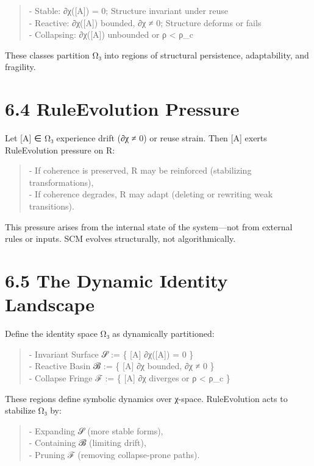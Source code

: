 \begin{quote}
- Stable: ∂χ({[}A{]}) = 0; Structure invariant under reuse\\
- Reactive: ∂χ({[}A{]}) bounded, ∂χ ≠ 0; Structure deforms or fails\\
- Collapsing: ∂χ({[}A{]}) unbounded or ρ \textless{} ρ\_c
\end{quote}

These classes partition Ω₃ into regions of structural persistence,
adaptability, and fragility.

\section{6.4 \textbar{} RuleEvolution
Pressure}\label{ruleevolution-pressure}

Let {[}A{]} ∈ Ω₃ experience drift (∂χ ≠ 0) or reuse strain. Then {[}A{]}
exerts RuleEvolution pressure on R:

\begin{quote}
- If coherence is preserved, R may be reinforced (stabilizing
transformations),\\
- If coherence degrades, R may adapt (deleting or rewriting weak
transitions).
\end{quote}

This pressure arises from the internal state of the system---not from
external rules or inputs. SCM evolves structurally, not algorithmically.

\section{6.5 \textbar{} The Dynamic Identity
Landscape}\label{the-dynamic-identity-landscape}

Define the identity space Ω₃ as dynamically partitioned:

\begin{quote}
- Invariant Surface 𝓢 := \{ {[}A{]} \textbar{} ∂χ({[}A{]}) = 0 \}\\
- Reactive Basin 𝓑 := \{ {[}A{]} \textbar{} ∂χ bounded, ∂χ ≠ 0 \}\\
- Collapse Fringe ℱ := \{ {[}A{]} \textbar{} ∂χ diverges or ρ
\textless{} ρ\_c \}
\end{quote}

These regions define symbolic dynamics over χ-space. RuleEvolution acts
to stabilize Ω₃ by:

\begin{quote}
- Expanding 𝓢 (more stable forms),\\
- Containing 𝓑 (limiting drift),\\
- Pruning ℱ (removing collapse-prone paths).
\end{quote}


